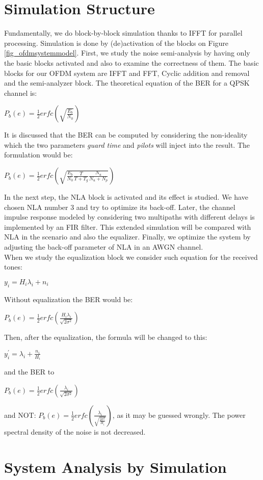 \section{Simulation Structure}
\label{sec_simstruct}
Fundamentally, we do block-by-block simulation thanks to IFFT for parallel processing. Simulation is done by (de)activation of the blocks on Figure \ref{fig_ofdmsystemmodel}.
First, we study the noise semi-analysis by having only the basic blocks activated and also to examine the correctness of them. The basic blocks for our OFDM system are IFFT and FFT, Cyclic addition and removal and the semi-analyzer block. 
The theoretical equation of the BER for a QPSK channel is:\\
\begin{center} 
$P_{b}(e)= \frac{1}{2}erfc(\sqrt{\frac{E_{b}}{N_{0}}})$\\
\end{center}
It is discussed that the BER can be computed by considering the non-ideality which the two parameters \textit{guard time} and \textit{pilots} will inject into the result. The formulation would be:\\
\begin{center}
 $P_{b}(e)= \frac{1}{2}erfc(\sqrt{\frac{E_{b}}{N_{0}}\frac{T}{T+T_{g}}\frac{N_{u}}{N_{u}+N_{p}}})$\\
\end{center}

In the next step, the NLA block is activated and its effect is studied. We have chosen NLA number 3 and try to optimize its back-off.
Later, the channel impulse response modeled by considering two multipaths with different delays is implemented by an FIR filter. This extended simulation will be compared with NLA in the scenario and also the equalizer. Finally, we optimize the system by adjusting the back-off parameter of NLA in an AWGN channel.\\
When we study the equalization block we consider such equation for the received tones:
\begin{center}
$y_{i}= H_{i} \lambda_{i} + n_{i}$\\
\end{center}
Without equalization the BER would be:
\begin{center}
$P_{b}(e)= \frac{1}{2}erfc(\frac{H_{i} \lambda_{i}}{\sqrt{2 \sigma^{2}}})$\\
\end{center}
Then, after the equalization, the formula will be changed to this:\\
\begin{center}
$y^{\prime}_{i}= \lambda_{i} + \frac{n_{i}}{H_{i}}$\\
\end{center}
and the BER to
\begin{center}
 $P_{b}(e)= \frac{1}{2}erfc(\frac{\lambda_{i}}{\sqrt{2 \sigma^{2}}})$\\
\end{center}
and NOT: $P_{b}(e)= \frac{1}{2}erfc(\frac{\lambda_{i}}{\sqrt{\frac{2 \sigma^{2}}{H_{i}}}})$, as it may be guessed wrongly. The power spectral density of the noise is not decreased.
\section{System Analysis by Simulation}
\label{sec_anasim}

